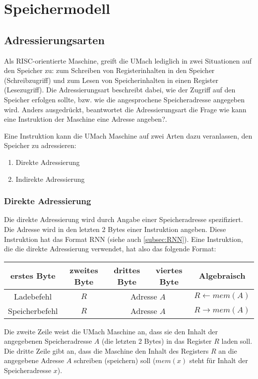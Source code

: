 \section{Speichermodell}

\subsection{Adressierungsarten}
\label{subsec:Adressierungsarten}

Als RISC-orientierte Maschine, greift die UMach lediglich in zwei Situationen
auf den Speicher zu: zum Schreiben von Registerinhalten in den Speicher
(Schreibzugriff) und zum Lesen von Speicherinhalten in einen Register
(Lesezugriff).  Die \gls{Adressierungsart} beschreibt dabei, wie der Zugriff
auf den Speicher erfolgen sollte, bzw. wie die angesprochene Speicheradresse
angegeben wird. Anders ausgedrückt, beantwortet die Adressierungsart die Frage
\glqq wie kann eine Instruktion der Maschine eine Adresse angeben?\grqq. 


Eine Instruktion kann die UMach Maschine auf zwei Arten dazu veranlassen,
den Speicher zu adressieren: 
\begin{enumerate}
  \item Direkte Adressierung
  \item Indirekte Adressierung
\end{enumerate}


\subsubsection{Direkte Adressierung}

Die direkte Adressierung wird durch Angabe einer Speicheradresse spezifiziert.
Die Adresse wird in den letzten 2 Bytes einer Instruktion angeben. Diese
Instruktion hat das Format RNN (siehe auch \ref{subsec:RNN}). Eine Instruktion,
die die direkte Adressierung verwendet, hat also das folgende Format:
\begin{center}
  \begin{tabular}{|*{4}{c|}|c|} \hline
    erstes Byte    & zweites Byte  & drittes Byte  & viertes Byte & Algebraisch
\\\hline\hline
    Ladebefehl     & $R$ & \multicolumn{2}{c||}{Adresse $A$} &
    $R \gets mem(A)$ \\\hline
    Speicherbefehl & $R$ & \multicolumn{2}{c||}{Adresse $A$} &
    $R \to mem(A)$   \\\hline
  \end{tabular}
\end{center}
Die zweite Zeile weist die UMach Maschine an, dass sie den Inhalt der
angegebenen Speicheradresse $A$ (die letzten 2 Bytes) in das Register $R$ laden
soll. Die dritte Zeile gibt an, dass die Maschine den Inhalt des Registers $R$
an die angegebene Adresse $A$ schreiben (speichern) soll ($mem(x)$ steht für
Inhalt der Speicheradresse $x$).

